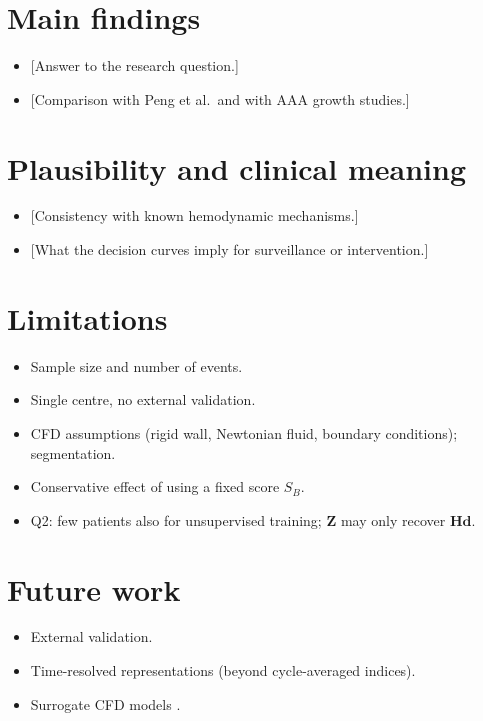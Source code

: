 \section{Main findings}
\begin{itemize}
    \item {[}Answer to the research question.]
    \item {[}Comparison with Peng et al.\ and with AAA growth studies.]  \cite{forneris_ai-powered_2023, kim_deep_2023}
\end{itemize}

\section{Plausibility and clinical meaning}
\begin{itemize}
    \item {[}Consistency with known hemodynamic mechanisms.]
    \item {[}What the decision curves imply for surveillance or intervention.]
\end{itemize}

\section{Limitations}
\begin{itemize}
    \item Sample size and number of events.
    \item Single centre, no external validation.
    \item CFD assumptions (rigid wall, Newtonian fluid, boundary conditions); segmentation.
    \item Conservative effect of using a fixed score $S_B$.
    \item Q2: few patients also for unsupervised training; $\mathbf{Z}$ may only recover $\mathbf{Hd}$.
\end{itemize}

\section{Future work}
\begin{itemize}
    \item External validation.
    \item Time-resolved representations (beyond cycle-averaged indices).
    \item Surrogate CFD models \cite{faisal_rapid_2025}.
\end{itemize}
